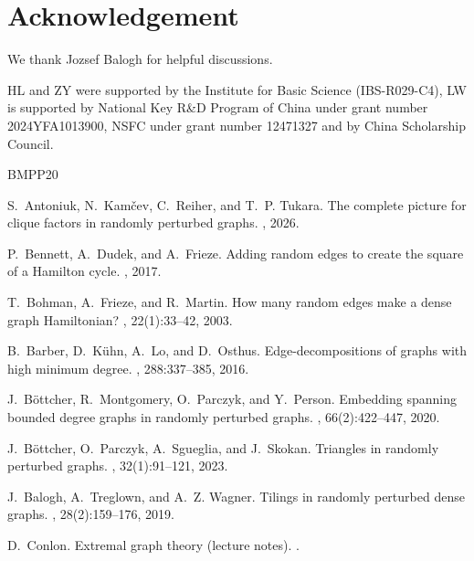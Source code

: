 \documentclass[11pt,reqno]{amsart}
\theoremstyle{definition}
\theoremstyle{remark}
\begin{document}
\medskip



\section*{Acknowledgement}
We thank Jozsef Balogh for helpful discussions. 

HL and ZY were supported by the Institute for Basic Science (IBS-R029-C4), LW is supported by National Key R\&D Program of China under grant number 2024YFA1013900, NSFC under grant number 12471327 and by China Scholarship Council.




\begin{thebibliography}{BMPP20}

S.~Antoniuk, N.~Kam\v{c}ev, C.~Reiher, and T.~P. Tukara.
\newblock The complete picture for clique factors in randomly perturbed graphs.
, 2026.

P.~Bennett, A.~Dudek, and A.~Frieze.
\newblock Adding random edges to create the square of a {H}amilton cycle.
, 2017.

T.~Bohman, A.~Frieze, and R.~Martin.
\newblock How many random edges make a dense graph {H}amiltonian?
, 22(1):33--42, 2003.

B.~Barber, D.~K\"{u}hn, A.~Lo, and D.~Osthus.
\newblock Edge-decompositions of graphs with high minimum degree.
, 288:337--385, 2016.

J.~B\"{o}ttcher, R.~Montgomery, O.~Parczyk, and Y.~Person.
\newblock Embedding spanning bounded degree graphs in randomly perturbed graphs.
, 66(2):422--447, 2020.

J.~B\"{o}ttcher, O.~Parczyk, A.~Sgueglia, and J.~Skokan.
\newblock Triangles in randomly perturbed graphs.
, 32(1):91--121, 2023.

J.~Balogh, A.~Treglown, and A.~Z. Wagner.
\newblock Tilings in randomly perturbed dense graphs.
, 28(2):159--176, 2019.

D.~Conlon.
\newblock Extremal graph theory (lecture notes).
\newblock {}.


\end{thebibliography}
\end{document}
